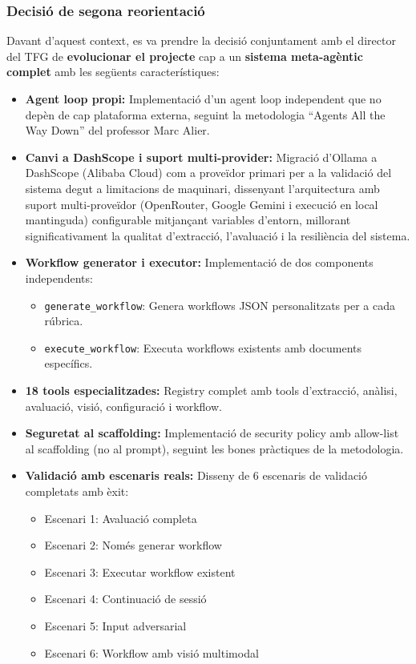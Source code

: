 \documentclass[12pt,a4paper,twoside]{report}
\begin{document}
\subsubsection{Decisi\'o de segona reorientaci\'o}

Davant d'aquest context, es va prendre la decisi\'o conjuntament amb el director del TFG de \textbf{evolucionar el projecte} cap a un \textbf{sistema meta-ag\`entic complet} amb les seg\"uents caracter\'istiques:

\begin{itemize}
    \item \textbf{Agent loop propi:} Implementaci\'o d'un agent loop independent que no dep\`en de cap plataforma externa, seguint la metodologia ``Agents All the Way Down'' del professor Marc Alier.
    \item \textbf{Canvi a DashScope i suport multi-provider:} Migraci\'o d'Ollama a DashScope (Alibaba Cloud) com a prove\"idor primari per a la validaci\'o del sistema degut a limitacions de maquinari, dissenyant l'arquitectura amb suport multi-prove\"idor (OpenRouter, Google Gemini i execuci\'o en local mantinguda) configurable mitjan\c{c}ant variables d'entorn, millorant significativament la qualitat d'extracci\'o, l'avaluaci\'o i la resili\`encia del sistema.
    \item \textbf{Workflow generator i executor:} Implementaci\'o de dos components independents:
    \begin{itemize}
        \item \texttt{generate\_workflow}: Genera workflows JSON personalitzats per a cada r\'ubrica.
        \item \texttt{execute\_workflow}: Executa workflows existents amb documents espec\'ifics.
    \end{itemize}
    \item \textbf{18 tools especialitzades:} Registry complet amb tools d'extracci\'o, an\`alisi, avaluaci\'o, visi\'o, configuraci\'o i workflow.
    \item \textbf{Seguretat al scaffolding:} Implementaci\'o de security policy amb allow-list al scaffolding (no al prompt), seguint les bones pr\`actiques de la metodologia.
    \item \textbf{Validaci\'o amb escenaris reals:} Disseny de 6 escenaris de validaci\'o completats amb \`exit:
    \begin{itemize}
        \item Escenari 1: Avaluaci\'o completa
        \item Escenari 2: Nom\'es generar workflow
        \item Escenari 3: Executar workflow existent
        \item Escenari 4: Continuaci\'o de sessi\'o
        \item Escenari 5: Input adversarial
        \item Escenari 6: Workflow amb visi\'o multimodal
    \end{itemize}
\end{itemize}
\end{document}
